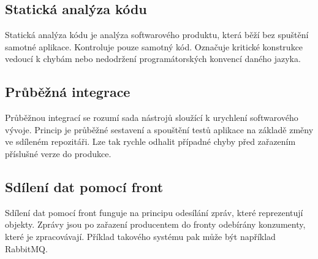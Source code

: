 \documentclass[thesis=B,czech]{FITthesis}[2012/06/26]
\begin{document}
\subsection{Statická analýza kódu}
Statická analýza kódu je analýza softwarového produktu, která běží bez spuštění samotné aplikace. Kontroluje 
pouze samotný kód. Označuje kritické konstrukce vedoucí k chybám nebo nedodržení programátorských konvencí daného
jazyka.
\subsection{Průběžná integrace}
Průběžnou integrací se rozumí sada nástrojů sloužící k urychlení softwarového vývoje. Princip je průběžné sestavení
a spouštění testů aplikace na základě změny ve sdíleném repozitáři. Lze tak rychle odhalit případné chyby před zařazením 
příslušné verze do produkce.\cite{CI}

\subsection{Sdílení dat pomocí front}
Sdílení dat pomocí front funguje na principu odesílání zpráv, které reprezentují objekty. Zprávy jsou po zařazení producentem do fronty odebírány
konzumenty, které je zpracovávají.
Příklad takového systému pak může být například RabbitMQ. \cite{rabbitMQ}
\end{document}
